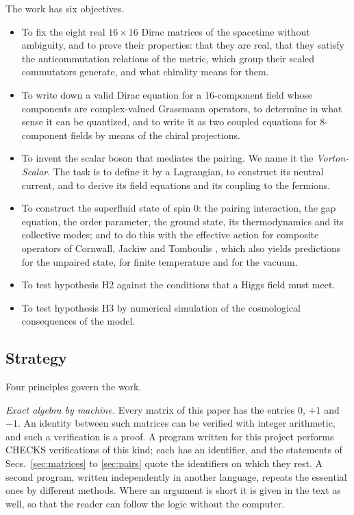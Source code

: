 The work has six objectives.
\begin{itemize}
\item[O1.] To fix the eight real $16\times16$ Dirac matrices of the spacetime without ambiguity, and to
prove their properties: that they are real, that they satisfy the anticommutation relations of the
metric, which group their scaled commutators generate, and what chirality means for them.
\item[O2.] To write down a valid Dirac equation for a 16-component field whose components are
complex-valued Grassmann operators, to determine in what sense it can be quantized, and to write it as
two coupled equations for 8-component fields by means of the chiral projections.
\item[O3.] To invent the scalar boson that mediates the pairing. We name it the \emph{Vorton-Scalar}.
The task is to define it by a Lagrangian, to construct its neutral current, and to derive its field
equations and its coupling to the fermions.
\item[O4.] To construct the superfluid state of spin 0: the pairing interaction, the gap equation, the
order parameter, the ground state, its thermodynamics and its collective modes; and to do this with the
effective action for composite operators of Cornwall, Jackiw and Tomboulis \cite{CJT1974}, which also
yields predictions for the unpaired state, for finite temperature and for the vacuum.
\item[O5.] To test hypothesis H2 against the conditions that a Higgs field must meet.
\item[O6.] To test hypothesis H3 by numerical simulation of the cosmological consequences of the
model.
\end{itemize}

\subsection{Strategy}

Four principles govern the work.

\emph{Exact algebra by machine.} Every matrix of this paper has the entries $0$, $+1$ and $-1$. An
identity between such matrices can be verified with integer arithmetic, and such a verification is a
proof. A program written for this project performs {{CHECKS}} verifications of this kind; each has an
identifier, and the statements of Secs.~\ref{sec:matrices} to \ref{sec:pairs} quote the identifiers on
which they rest. A second program, written independently in another language, repeats the essential
ones by different methods. Where an argument is short it is given in the text as well, so that the
reader can follow the logic without the computer.

